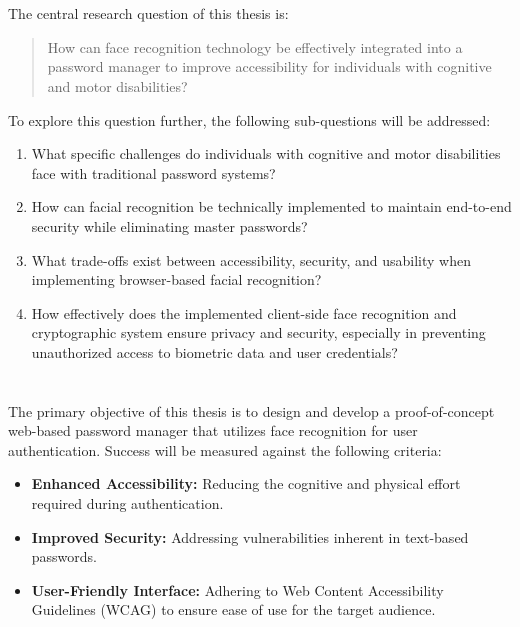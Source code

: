 \section{}%
\label{sec:onderzoeksvraag}

The central research question of this thesis is:
\begin{quote}
How can face recognition technology be effectively integrated into a password manager to improve accessibility for individuals with cognitive and motor disabilities?
\end{quote}

To explore this question further, the following sub-questions will be addressed:
\begin{enumerate}
  \item What specific challenges do individuals with cognitive and motor disabilities face with traditional password systems?
  \item How can facial recognition be technically implemented to maintain end-to-end security while eliminating master passwords?
  \item What trade-offs exist between accessibility, security, and usability when implementing browser-based facial recognition?
  \item How effectively does the implemented client-side face recognition and cryptographic system ensure privacy and security, especially in preventing unauthorized access to biometric data and user credentials?
\end{enumerate}

\section{}%
\label{sec:onderzoeksdoelstelling}

The primary objective of this thesis is to design and develop a proof-of-concept web-based password manager that utilizes face recognition for user authentication. Success will be measured against the following criteria:
\begin{itemize}
  \item \textbf{Enhanced Accessibility:} Reducing the cognitive and physical effort required during authentication.
  \item \textbf{Improved Security:} Addressing vulnerabilities inherent in text-based passwords.
  \item \textbf{User-Friendly Interface:} Adhering to Web Content Accessibility Guidelines (WCAG) to ensure ease of use for the target audience.
\end{itemize}


